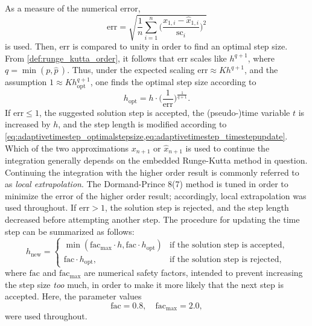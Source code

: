 As a measure of the numerical error,
\begin{equation}
    \label{eq:adaptivetimestep_errorestimate}
    \mathrm{err} = \sqrt{\frac{1}{n}\sum\limits_{i=1}^{n}%
    \bigg(\frac{x_{1,i}-\widehat{x}_{1,i}}{\mathrm{sc}_{i}}\bigg)^{2}}
\end{equation}
is used. Then, $\mathrm{err}$ is compared to unity in order to find an optimal
step size. From \cref{def:runge_kutta_order}, it follows that $\mathrm{err}$
scales like $h^{q+1}$, where $q = \min(p,\widehat{p}\,)$. Thus, under
the expected scaling $\mathrm{err}\approx{}Kh^{q+1}$, and the assumption
$1\approx{}Kh_{\mathrm{opt}}^{q+1}$, one finds the optimal step size according
to
\begin{equation}
    \label{eq:adaptivetimestep_optimalstepsize}
    h_{\mathrm{opt}} = h\cdot%
    \bigg(\frac{1}{\mathrm{err}}\bigg)^{\frac{1}{q+1}}.
\end{equation}
If $\mathrm{err}\leq1$, the suggested solution step is accepted, the
(pseudo-)time variable $t$ is increased by $h$, and the step length is modified
according to
\cref{eq:adaptivetimestep_optimalstepsize,eq:adaptivetimestep_timestepupdate}.
Which of the two approximations $x_{n+1}$ or $\widehat{x}_{n+1}$ is used to
continue the integration generally depends on the embedded Runge-Kutta method
in question. Continuing the integration with the higher order result is
commonly referred to as \emph{local extrapolation}. The Dormand-Prince 8(7)
method is tuned in order to minimize the error of the higher order result;
accordingly, local extrapolation was used throughout. If $\mathrm{err} > 1$, the
solution step is rejected, and the step length decreased before attempting
another step. The procedure for updating the time step can be summarized
as follows:
\begin{equation}
    \label{eq:adaptivetimestep_timestepupdate}
    h_{\mathrm{new}} = %
    \begin{cases}
        \min(\mathrm{fac}_{\mathrm{max}}\cdot{}h,%
        \mathrm{fac}\cdot{}h_{\mathrm{opt}}) %
        & \text{if the solution step is accepted,}\\
        \mathrm{fac}\cdot{}h_{\mathrm{opt}}, %
        & \text{if the solution step is rejected,}
    \end{cases}
\end{equation}
where $\mathrm{fac}$ and $\mathrm{fac}_{\mathrm{max}}$ are numerical safety
factors, intended to prevent increasing the step size \emph{too} much, in order
to make it more likely that the next step is accepted. Here, the parameter
values
\begin{equation}
    \label{eq:adaptivetimetep_safetyfactors}
    \mathrm{fac}=0.8,\quad \mathrm{fac}_{\mathrm{max}} = 2.0,
\end{equation}
were used throughout.
